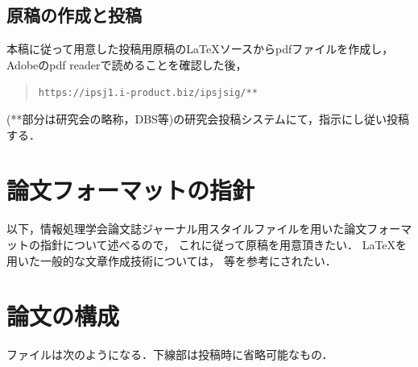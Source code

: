 \documentclass[submit,ses,noauthor]{ipsj-lualatex}
\def\|{\verb|}
\begin{document}
%2.2
\subsection{原稿の作成と投稿}

本稿に従って用意した投稿用原稿の\LaTeX ソースからpdfファイルを作成し，
Adobeのpdf readerで読めることを確認した後，
\begin{quote}
\small
\|https://ipsj1.i-product.biz/ipsjsig/**|
\end{quote}
(**部分は研究会の略称，DBS等)の研究会投稿システムにて，指示にし従い投稿する．







\section{論文フォーマットの指針}
\label{sec:format}

以下，情報処理学会論文誌ジャーナル用スタイルファイルを用いた論文フォーマットの指針について述べるので，
これに従って原稿を用意頂きたい．
\LaTeX を用いた一般的な文章作成技術については，
\cite{okumura, companion} 等を参考にされたい．



\section{論文の構成}
\label{config}

ファイルは次のようになる．下線部は投稿時に省略可能なもの．
\end{document}
